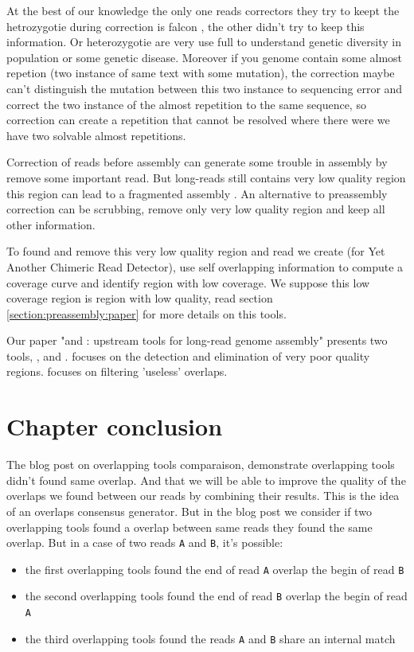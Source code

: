 \documentclass[main.tex]{subfiles}
\begin{document}
At the best of our knowledge the only one reads correctors they try to keept the hetrozygotie during correction is falcon \cite{falcon}, the other didn't try to keep this information. Or heterozygotie are very use full to understand genetic diversity in population or some genetic disease.
Moreover if you genome contain some almost repetion (two instance of same text with some mutation), the correction maybe can't distinguish the mutation between this two instance to sequencing error and correct the two instance of the almost repetition to the same sequence, so correction can create a repetition that cannot be resolved where there were we have two solvable almost repetitions.

Correction of reads before assembly can generate some trouble in assembly by remove some important read. But long-reads still contains very low quality region \cite{blog_post_error_repartition} this region can lead to a fragmented assembly \cite{long_read_assembler_comparison}. An alternative to preassembly correction can be scrubbing, remove only very low quality region and keep all other information.

To found and remove this very low quality region and read we create \yacrd (for Yet Another Chimeric Read Detector), \yacrd use self overlapping information to compute a coverage curve and identify region with low coverage. We suppose this low coverage region is region with low quality, read section \ref{section:preassembly:paper} for more details on this tools.


Our paper "\yacrd and \fpa: upstream tools for long-read genome assembly" presents two tools, \yacrd , and \fpa. \yacrd focuses on the detection and elimination of very poor quality regions. \fpa focuses on filtering 'useless' overlaps.





\section{Chapter conclusion}

The blog post on overlapping tools comparaison, demonstrate overlapping tools didn't found same overlap. And that we will be able to improve the quality of the overlaps we found between our reads by combining their results. This is the idea of an overlaps consensus generator. But in the blog post we consider if two overlapping tools found a overlap between same reads they found the same overlap. But in a case of two reads \texttt{A} and \texttt{B}, it's possible:
\begin{itemize}
    \item the first overlapping tools found the end of read \texttt{A} overlap the begin of read \texttt{B}
    \item the second overlapping tools found the end of read \texttt{B} overlap the begin of read \texttt{A}
    \item the third overlapping tools found the reads \texttt{A} and \texttt{B} share an internal match
\end{itemize}
\end{document}
